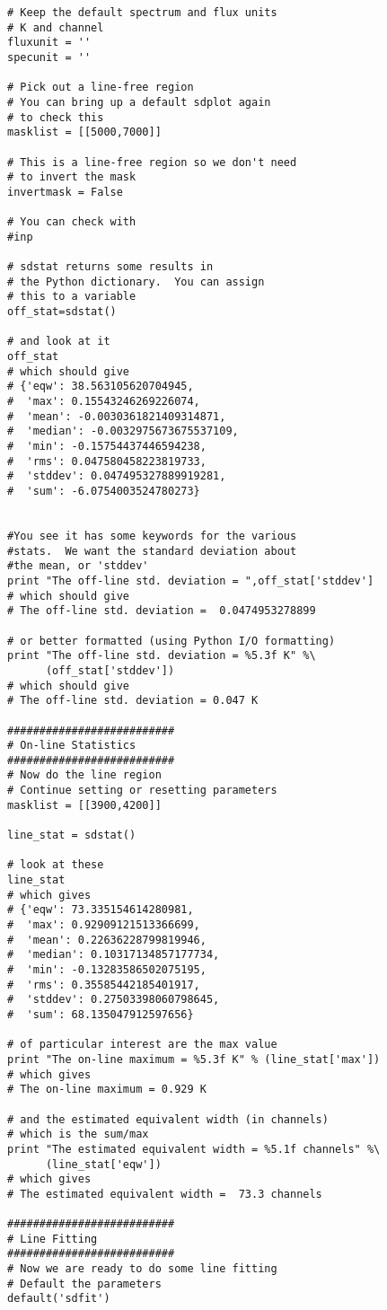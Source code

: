\begin{verbatim}
# Keep the default spectrum and flux units
# K and channel
fluxunit = ''
specunit = ''

# Pick out a line-free region
# You can bring up a default sdplot again
# to check this
masklist = [[5000,7000]]

# This is a line-free region so we don't need
# to invert the mask
invertmask = False

# You can check with
#inp

# sdstat returns some results in
# the Python dictionary.  You can assign
# this to a variable
off_stat=sdstat()

# and look at it
off_stat
# which should give
# {'eqw': 38.563105620704945,
#  'max': 0.15543246269226074,
#  'mean': -0.0030361821409314871,
#  'median': -0.0032975673675537109,
#  'min': -0.15754437446594238,
#  'rms': 0.047580458223819733,
#  'stddev': 0.047495327889919281,
#  'sum': -6.0754003524780273}


#You see it has some keywords for the various
#stats.  We want the standard deviation about
#the mean, or 'stddev'
print "The off-line std. deviation = ",off_stat['stddev']
# which should give
# The off-line std. deviation =  0.0474953278899

# or better formatted (using Python I/O formatting)
print "The off-line std. deviation = %5.3f K" %\
      (off_stat['stddev'])
# which should give
# The off-line std. deviation = 0.047 K

##########################
# On-line Statistics
##########################
# Now do the line region
# Continue setting or resetting parameters
masklist = [[3900,4200]]

line_stat = sdstat()

# look at these
line_stat
# which gives
# {'eqw': 73.335154614280981,
#  'max': 0.92909121513366699,
#  'mean': 0.22636228799819946,
#  'median': 0.10317134857177734,
#  'min': -0.13283586502075195,
#  'rms': 0.35585442185401917,
#  'stddev': 0.27503398060798645,
#  'sum': 68.135047912597656}

# of particular interest are the max value
print "The on-line maximum = %5.3f K" % (line_stat['max'])
# which gives
# The on-line maximum = 0.929 K

# and the estimated equivalent width (in channels)
# which is the sum/max
print "The estimated equivalent width = %5.1f channels" %\
      (line_stat['eqw'])
# which gives
# The estimated equivalent width =  73.3 channels

##########################
# Line Fitting
##########################
# Now we are ready to do some line fitting
# Default the parameters
default('sdfit')


\end{verbatim}
